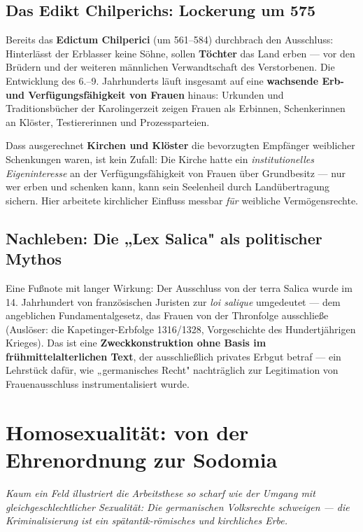 \documentclass[11pt,a4paper,ngerman]{scrartcl}
\newcommand{\chipbase}[2]{\hspace{0pt}{\footnotesize\textcolor{#1}{[\textsc{#2}]}}}
\newcommand{\chipbelegt}[1]{\chipbase{chipgreen}{#1}}
\newcommand{\chipplausibel}[1]{\chipbase{chipamber}{#1}}
\begin{document}
\subsection*{Das Edikt Chilperichs: Lockerung um 575}

Bereits das \textbf{Edictum Chilperici} (um 561–584) durchbrach den Ausschluss: Hinterlässt der Erblasser keine Söhne, sollen \textbf{Töchter} das Land erben — vor den Brüdern und der weiteren männlichen Verwandtschaft des Verstorbenen. Die Entwicklung des 6.–9. Jahrhunderts läuft insgesamt auf eine \textbf{wachsende Erb- und Verfügungsfähigkeit von Frauen} hinaus: Urkunden und Traditionsbücher der Karolingerzeit zeigen Frauen als Erbinnen, Schenkerinnen an Klöster, Testiererinnen und Prozessparteien. \chipbelegt{belegt}

Dass ausgerechnet \textbf{Kirchen und Klöster} die bevorzugten Empfänger weiblicher Schenkungen waren, ist kein Zufall: Die Kirche hatte ein \emph{institutionelles Eigeninteresse} an der Verfügungsfähigkeit von Frauen über Grundbesitz — nur wer erben und schenken kann, kann sein Seelenheil durch Landübertragung sichern. Hier arbeitete kirchlicher Einfluss messbar \emph{für} weibliche Vermögensrechte. \chipplausibel{plausibel}

\subsection*{Nachleben: Die „Lex Salica" als politischer Mythos}

Eine Fußnote mit langer Wirkung: Der Ausschluss von der terra Salica wurde im 14. Jahrhundert von französischen Juristen zur \emph{loi salique} umgedeutet — dem angeblichen Fundamentalgesetz, das Frauen von der Thronfolge ausschließe (Auslöser: die Kapetinger-Erbfolge 1316/1328, Vorgeschichte des Hundertjährigen Krieges). Das ist eine \textbf{Zweckkonstruktion ohne Basis im frühmittelalterlichen Text}, der ausschließlich privates Erbgut betraf — ein Lehrstück dafür, wie „germanisches Recht" nachträglich zur Legitimation von Frauenausschluss instrumentalisiert wurde. \chipbelegt{belegt}


\section{Homosexualität: von der Ehrenordnung zur Sodomia}

\noindent\textit{Kaum ein Feld illustriert die Arbeitsthese so scharf wie der Umgang mit gleichgeschlechtlicher Sexualität: Die germanischen Volksrechte schweigen — die Kriminalisierung ist ein spätantik-römisches und kirchliches Erbe.}
\medskip
\end{document}
